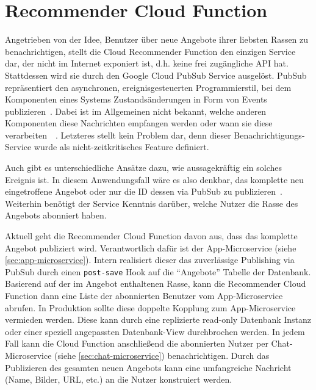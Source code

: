 \documentclass{article}
\begin{document}
\section{Recommender Cloud Function} %

Angetrieben von der Idee, Benutzer über neue Angebote ihrer liebsten Rassen zu benachrichtigen, stellt die Cloud Recommender Function den einzigen Service dar, der nicht im Internet exponiert ist, d.h. keine frei zugängliche API hat. Stattdessen wird sie durch den Google Cloud PubSub Service ausgelöst. PubSub repräsentiert den asynchronen, ereignisgesteuerten Programmierstil, bei dem Komponenten eines Systems Zustandsänderungen in Form von Events publizieren~\cite{pubsub-doc}. Dabei ist im Allgemeinen nicht bekannt, welche anderen Komponenten diese Nachrichten empfangen werden oder wann sie diese verarbeiten~\cite[pp.~1--2]{hinze2009event}~\cite[p.~3]{marechaux2006combining}. Letzteres stellt kein Problem dar, denn dieser Benachrichtigungs-Service wurde als nicht-zeitkritisches Feature definiert.

Auch gibt es unterschiedliche Ansätze dazu, wie aussagekräftig ein solches Ereignis ist. In diesem Anwendungsfall wäre es also denkbar, das komplette neu eingetroffene Angebot oder nur die ID dessen via PubSub zu publizieren~\cite[p.~3]{michelson2006event}. Weiterhin benötigt der Service Kenntnis darüber, welche Nutzer die Rasse des Angebots abonniert haben. 

Aktuell geht die Recommender Cloud Function davon aus, dass das komplette Angebot publiziert wird. Verantwortlich dafür ist der App-Microservice (siehe \autoref{sec:app-microservice}). Intern realisiert dieser das zuverlässige Publishing via PubSub durch einen \texttt{post-save} Hook auf die \enquote{Angebote} Tabelle der Datenbank. Basierend auf der im Angebot enthaltenen Rasse, kann die Recommender Cloud Function dann eine Liste der abonnierten Benutzer vom App-Microservice abrufen. In Produktion sollte diese doppelte Kopplung zum App-Microservice vermieden werden. Diese kann durch eine replizierte read-only Datenbank Instanz oder einer speziell angepassten Datenbank-View durchbrochen werden. In jedem Fall kann die Cloud Function anschließend die abonnierten Nutzer per Chat-Microservice (siehe \autoref{sec:chat-microservice}) benachrichtigen. Durch das Publizieren des gesamten neuen Angebots kann eine umfangreiche Nachricht (Name, Bilder, URL, etc.) an die Nutzer konstruiert werden. 
\end{document}
